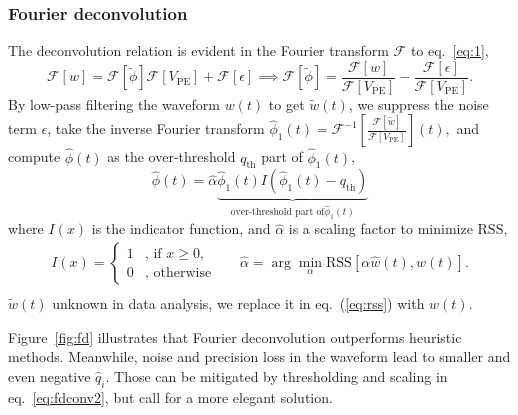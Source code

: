 \subsubsection{Fourier deconvolution}
\label{sec:fourier}
The deconvolution relation is evident in the Fourier transform $\mathcal{F}$ to eq.~\eqref{eq:1},
\begin{equation}
  \label{eq:fourier}
  \mathcal{F}[w]  = \mathcal{F}[\tilde{\phi}]\mathcal{F}[V_\mathrm{PE}] + \mathcal{F}[\epsilon]
  \implies \mathcal{F}[\tilde{\phi}]  = \frac{\mathcal{F}[w]}{\mathcal{F}[V_\mathrm{PE}]} - \frac{\mathcal{F}[\epsilon]}{\mathcal{F}[V_\mathrm{PE}]}.
\end{equation}
By low-pass filtering the waveform $w(t)$ to get $\tilde{w}(t)$, we suppress the noise term $\epsilon$, take the inverse Fourier transform $\hat{\phi}_1(t) = \mathcal{F}^{-1}\left[\frac{\mathcal{F}[\tilde{w}]}{\mathcal{F}[V_\mathrm{PE}]}\right](t),$ and compute $\hat{\phi}(t)$ as the over-threshold $q_\mathrm{th}$ part of $\hat{\phi}_1(t)$,
\begin{equation}
  \label{eq:fdconv2}
    \hat{\phi}(t) = \hat{\alpha}\underbrace{\hat{\phi}_1(t) I\left(\hat{\phi}_1(t) - q_\mathrm{th}\right)}_{\text{over-threshold part of} \hat{\phi}_1(t)}  
\end{equation}
where $I(x)$ is the indicator function, and $\hat{\alpha}$ is a scaling factor to minimize $\mathrm{RSS}$,
\begin{equation*}
  \begin{aligned}
  \label{eq:id}
  I(x) = \left\{
    \begin{array}{ll}
      1 & \mbox{, if $x\ge0$}, \\
      0 & \mbox{, otherwise}
    \end{array}
    \right.
    \quad~~~
    \hat{\alpha} = \arg \underset{\alpha}{\min}\mathrm{RSS}\left[\alpha\hat{w}(t),w(t)\right]. \\
  \end{aligned}
\end{equation*}
$\tilde{w}(t)$ unknown in data analysis, we replace it in eq.~(\ref{eq:rss}) with $w(t)$.

Figure~\ref{fig:fd} illustrates that Fourier deconvolution outperforms heuristic methods.  Meanwhile, noise and precision loss in the waveform lead to smaller and even negative $\hat{q}_i$. Those can be mitigated by thresholding and scaling in eq.~\eqref{eq:fdconv2}, but call for a more elegant solution.

